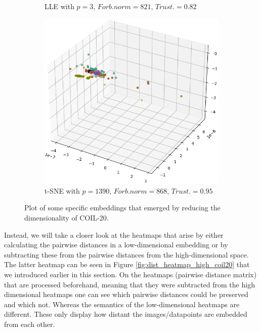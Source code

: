 \begin{figure}[!]
\begin{subfigure}[t]{0.55\columnwidth}
    	\caption{LLE with $p=3$, $Forb.norm=821$, $Trust.=0.82$}
        \label{fig:plot_lle_coil20_3}
    \end{subfigure}
     \hfill
     \begin{subfigure}[t]{0.55\columnwidth}
    	\centering
    	\includegraphics[width=\columnwidth]{images/plot_tsne_coil20_1390.png}
    	\caption{t-SNE with $p=1390$, $Forb.norm=868$, $Trust.=0.95$}
        \label{fig:plot_tsne_coil20_1390}
    \end{subfigure}
     \caption[Low Dimensional COIL-20 Plots]{Plot of some specific embeddings that emerged by reducing the dimensionality of COIL-20.}
    \label{fig:low_coil_plots}
\end{figure}

Instead, we will take a closer look at the heatmaps that arise by either calculating the pairwise distances in a low-dimensional embedding or by subtracting these from the pairwise distances from the high-dimensional space. The latter heatmap can be seen in Figure \ref{fig:dist_heatmap_high_coil20} that we introduced earlier in this section. On the heatmaps (pairwise distance matrix) that are processed beforehand, meaning that they were subtracted from the high dimensional heatmaps one can see which pairwise distances could be preserved and which not. Whereas the semantics of the low-dimensional heatmaps are different. These only display how distant the images/datapoints are embedded from each other.

